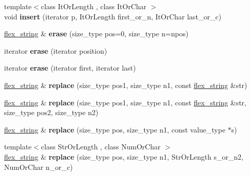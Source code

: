 \begin{DoxyCompactItemize}
\item 
\hypertarget{classflex__string_af803c29f025be644d4247841d0a19f57}{}{\footnotesize template$<$class It\+Or\+Length , class It\+Or\+Char $>$ }\\void {\bfseries insert} (iterator p, It\+Or\+Length first\+\_\+or\+\_\+n, It\+Or\+Char last\+\_\+or\+\_\+c)\label{classflex__string_af803c29f025be644d4247841d0a19f57}

\item 
\hypertarget{classflex__string_a2643bc7c6b8645e6a68325cd5abaaf1b}{}\hyperlink{classflex__string}{flex\+\_\+string} \& {\bfseries erase} (size\+\_\+type pos=0, size\+\_\+type n=npos)\label{classflex__string_a2643bc7c6b8645e6a68325cd5abaaf1b}

\item 
\hypertarget{classflex__string_ab655fa9ddc17b4ddf0a6c5fbbf5482b9}{}iterator {\bfseries erase} (iterator position)\label{classflex__string_ab655fa9ddc17b4ddf0a6c5fbbf5482b9}

\item 
\hypertarget{classflex__string_a14e27f548e81824bd275ae434e28f8fd}{}iterator {\bfseries erase} (iterator first, iterator last)\label{classflex__string_a14e27f548e81824bd275ae434e28f8fd}

\item 
\hypertarget{classflex__string_ac8846d323c27d9682d528bb3146cd665}{}\hyperlink{classflex__string}{flex\+\_\+string} \& {\bfseries replace} (size\+\_\+type pos1, size\+\_\+type n1, const \hyperlink{classflex__string}{flex\+\_\+string} \&str)\label{classflex__string_ac8846d323c27d9682d528bb3146cd665}

\item 
\hypertarget{classflex__string_a688e173ef34b3df6d5e7ff7b75a93d77}{}\hyperlink{classflex__string}{flex\+\_\+string} \& {\bfseries replace} (size\+\_\+type pos1, size\+\_\+type n1, const \hyperlink{classflex__string}{flex\+\_\+string} \&str, size\+\_\+type pos2, size\+\_\+type n2)\label{classflex__string_a688e173ef34b3df6d5e7ff7b75a93d77}

\item 
\hypertarget{classflex__string_a728de078552de8651b106af395aed9e7}{}\hyperlink{classflex__string}{flex\+\_\+string} \& {\bfseries replace} (size\+\_\+type pos, size\+\_\+type n1, const value\+\_\+type $\ast$s)\label{classflex__string_a728de078552de8651b106af395aed9e7}

\item 
\hypertarget{classflex__string_a028e18005476b8ccf22704e502244449}{}{\footnotesize template$<$class Str\+Or\+Length , class Num\+Or\+Char $>$ }\\\hyperlink{classflex__string}{flex\+\_\+string} \& {\bfseries replace} (size\+\_\+type pos, size\+\_\+type n1, Str\+Or\+Length s\+\_\+or\+\_\+n2, Num\+Or\+Char n\+\_\+or\+\_\+c)\label{classflex__string_a028e18005476b8ccf22704e502244449}


\end{DoxyCompactItemize}
